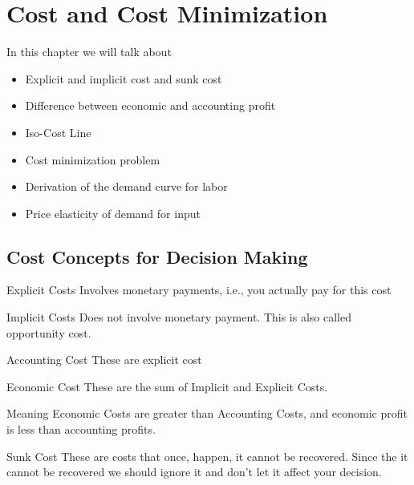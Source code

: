 \documentclass[../ECON-281-Notes.tex]{subfiles}
\begin{document}
\chapter{Cost and Cost Minimization}
In this chapter we will talk about 
\begin{itemize}
    \item Explicit and implicit cost and sunk cost
    \item Difference between economic and accounting profit
    \item Iso-Cost Line 
    \item Cost minimization problem 
    \item Derivation of the demand curve for labor
    \item Price elasticity of demand for input 
\end{itemize}
\section{Cost Concepts for Decision Making}

\begin{Definition}
    {Explicit Costs}
    Involves monetary payments, i.e., you actually pay for this cost
\end{Definition}

\begin{Definition}
    {Implicit Costs}
    Does not involve monetary payment. This is also called opportunity cost. 
\end{Definition}

\begin{Definition}
    {Accounting Cost}
    These are explicit cost
\end{Definition}

\begin{Definition}
    {Economic Cost}
    These are the sum of Implicit and Explicit Costs.

    Meaning Economic Costs are greater than Accounting Costs, and economic profit is less than accounting profits. 
\end{Definition}

\begin{Definition}
    {Sunk Cost}
    These are costs that once, happen, it cannot be recovered. Since the it cannot be recovered we should ignore it and don't let it affect your decision.
\end{Definition}
\end{document}
